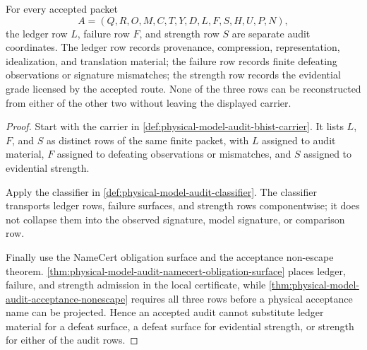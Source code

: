 \begin{theorem}
\label{thm:physical-model-audit-ledger-failure-strength-separation}
For every accepted packet
$$
A=(Q,R,O,M,C,T,Y,D,L,F,S,H,U,P,N),
$$
the ledger row $L$, failure row $F$, and strength row $S$ are separate audit coordinates. The ledger row records provenance, compression, representation, idealization, and translation material; the failure row records finite defeating observations or signature mismatches; the strength row records the evidential grade licensed by the accepted route. None of the three rows can be reconstructed from either of the other two without leaving the displayed carrier.
\end{theorem}
\begin{proof}
Start with the carrier in \autoref{def:physical-model-audit-bhist-carrier}. It lists $L$, $F$, and $S$ as distinct rows of the same finite packet, with $L$ assigned to audit material, $F$ assigned to defeating observations or mismatches, and $S$ assigned to evidential strength.

Apply the classifier in \autoref{def:physical-model-audit-classifier}. The classifier transports ledger rows, failure surfaces, and strength rows componentwise; it does not collapse them into the observed signature, model signature, or comparison row.

Finally use the NameCert obligation surface and the acceptance non-escape theorem. \autoref{thm:physical-model-audit-namecert-obligation-surface} places ledger, failure, and strength admission in the local certificate, while \autoref{thm:physical-model-audit-acceptance-nonescape} requires all three rows before a physical acceptance name can be projected. Hence an accepted audit cannot substitute ledger material for a defeat surface, a defeat surface for evidential strength, or strength for either of the audit rows.
\end{proof}

